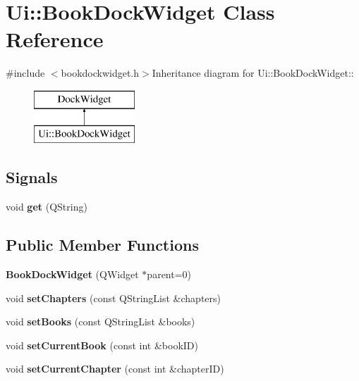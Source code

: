 \hypertarget{classUi_1_1BookDockWidget}{
\section{Ui::BookDockWidget Class Reference}
\label{classUi_1_1BookDockWidget}
}


{\ttfamily \#include $<$bookdockwidget.h$>$}Inheritance diagram for Ui::BookDockWidget::\begin{figure}[H]
\begin{center}
\leavevmode
\includegraphics[height=2cm]{classUi_1_1BookDockWidget}
\end{center}
\end{figure}
\subsection*{Signals}
\begin{DoxyCompactItemize}
\item 
\hypertarget{classUi_1_1BookDockWidget_ac920b1d821b30e1f46e3fc2cda5879c7}{
void {\bfseries get} (QString)}
\label{classUi_1_1BookDockWidget_ac920b1d821b30e1f46e3fc2cda5879c7}

\end{DoxyCompactItemize}
\subsection*{Public Member Functions}
\begin{DoxyCompactItemize}
\item 
\hypertarget{classUi_1_1BookDockWidget_abb7155fdad4ae78d59e81fc222db64ed}{
{\bfseries BookDockWidget} (QWidget $\ast$parent=0)}
\label{classUi_1_1BookDockWidget_abb7155fdad4ae78d59e81fc222db64ed}

\item 
\hypertarget{classUi_1_1BookDockWidget_aed8a40d949f01e65407195e35eae58c0}{
void {\bfseries setChapters} (const QStringList \&chapters)}
\label{classUi_1_1BookDockWidget_aed8a40d949f01e65407195e35eae58c0}

\item 
\hypertarget{classUi_1_1BookDockWidget_abfdb1d2dc627cb1e5c8517b388b04cfe}{
void {\bfseries setBooks} (const QStringList \&books)}
\label{classUi_1_1BookDockWidget_abfdb1d2dc627cb1e5c8517b388b04cfe}

\item 
\hypertarget{classUi_1_1BookDockWidget_ae54007401cb5347e906195bc15d76322}{
void {\bfseries setCurrentBook} (const int \&bookID)}
\label{classUi_1_1BookDockWidget_ae54007401cb5347e906195bc15d76322}

\item 
\hypertarget{classUi_1_1BookDockWidget_a56be27bb3e1d7afd28c254c575718ead}{
void {\bfseries setCurrentChapter} (const int \&chapterID)}
\label{classUi_1_1BookDockWidget_a56be27bb3e1d7afd28c254c575718ead}

\end{DoxyCompactItemize}
